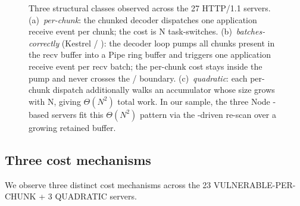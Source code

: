 \begin{figure}[t]

  \caption{Three structural classes observed across the 27 HTTP/1.1 servers.
  (a)~\emph{per-chunk}: the chunked decoder dispatches one
  application receive event per chunk; the cost is N task-switches.
  (b)~\emph{batches-correctly} (Kestrel /
  ): the decoder loop pumps all
  chunks present in the recv buffer into a Pipe ring buffer and
  triggers one application receive event per recv batch; the
  per-chunk cost stays inside the pump and never crosses the
  / boundary.
  (c)~\emph{quadratic}: each per-chunk dispatch additionally
  walks an accumulator whose size grows with N, giving
  $\Theta(N^2)$ total work. In our sample, the three Node
  -based servers fit this $\Theta(N^2)$ pattern
  via the -driven  re-scan over
  a growing retained  buffer.}
  \label{fig:arch-three-classes}
\end{figure}

\subsection{Three cost mechanisms}
\label{sec:rc-mechanisms}

We observe three distinct cost mechanisms across the 23
VULNERABLE-PER-CHUNK + 3 QUADRATIC servers.

